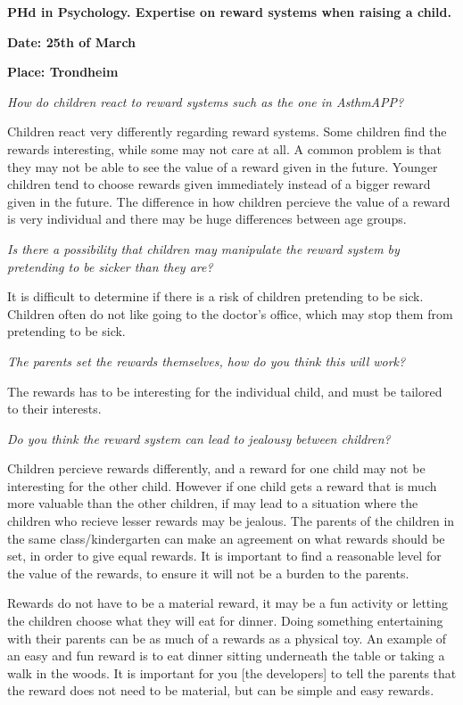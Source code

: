 \textbf{PHd in Psychology. Expertise on reward systems when raising a child.} 

\textbf{Date: 25th of March}

\textbf{Place: Trondheim}

\emph{How do children react to reward systems such as the one in AsthmAPP?}

Children react very differently regarding reward systems. Some children find the rewards interesting, while some may not care at all. A common problem is that they may not be able to see the value of a reward given in the future. Younger children tend to choose rewards given immediately instead of a bigger reward given in the future\cite{mischel1972cognitive}.
The difference in how children percieve the value of a reward is very individual and there may be huge differences between age groups. 


\emph{Is there a possibility that children may manipulate the reward system by pretending to be sicker than they are?}

It is difficult to determine if there is a risk of children pretending to be sick. Children often do not like going to the doctor's office, which may stop them from pretending to be sick.


\emph{The parents set the rewards themselves, how do you think this will work?}

The rewards has to be interesting for the individual child, and must be tailored to their interests. 

\emph{Do you think the reward system can lead to jealousy between children?}

Children percieve rewards differently, and a reward for one child may not be interesting for the other child. However if one child gets a reward that is much more valuable than the other children, if may lead to a situation where the children who recieve lesser rewards may be jealous. The parents of the children in the same class/kindergarten can make an agreement on what rewards should be set, in order to give equal rewards. It is important to find a reasonable level for the value of the rewards, to ensure it will not be a burden to the parents.

Rewards do not have to be a material reward, it may be a fun activity or letting the children choose what they will eat for dinner. Doing something entertaining with their parents can be as much of a rewards as a physical toy. An example of an easy and fun reward is to eat dinner sitting underneath the table or taking a walk in the woods. It is important for you [the developers] to tell the parents that the reward does not need to be material, but can be simple and easy rewards.


